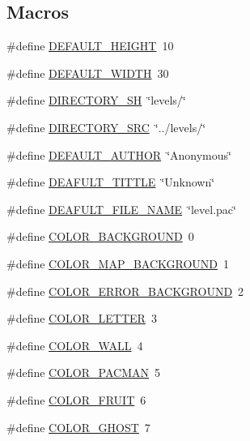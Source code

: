 \subsection*{Macros}
\begin{DoxyCompactItemize}
\item 
\#define \hyperlink{pacman-level-editor_8c_a1879f9e5604a01f0983829846001ab23}{D\-E\-F\-A\-U\-L\-T\-\_\-\-H\-E\-I\-G\-H\-T}~10
\item 
\#define \hyperlink{pacman-level-editor_8c_a93493eb8fae5549bd5be67f3449245e0}{D\-E\-F\-A\-U\-L\-T\-\_\-\-W\-I\-D\-T\-H}~30
\item 
\#define \hyperlink{pacman-level-editor_8c_a7a602a4376595097bdde82a739d7fc9c}{D\-I\-R\-E\-C\-T\-O\-R\-Y\-\_\-\-S\-H}~\char`\"{}levels/\char`\"{}
\item 
\#define \hyperlink{pacman-level-editor_8c_a680ab63d028a68a793615c14b807244e}{D\-I\-R\-E\-C\-T\-O\-R\-Y\-\_\-\-S\-R\-C}~\char`\"{}../levels/\char`\"{}
\item 
\#define \hyperlink{pacman-level-editor_8c_a0df6a4797ddf20bd10851daf8ba3e223}{D\-E\-F\-A\-U\-L\-T\-\_\-\-A\-U\-T\-H\-O\-R}~\char`\"{}Anonymous\char`\"{}
\item 
\#define \hyperlink{pacman-level-editor_8c_a4b3befe82323eb5de5dc65ccf44283ea}{D\-E\-A\-F\-U\-L\-T\-\_\-\-T\-I\-T\-T\-L\-E}~\char`\"{}Unknown\char`\"{}
\item 
\#define \hyperlink{pacman-level-editor_8c_afd9e8106b9402bf121477c457c8c9316}{D\-E\-A\-F\-U\-L\-T\-\_\-\-F\-I\-L\-E\-\_\-\-N\-A\-M\-E}~\char`\"{}level.\-pac\char`\"{}
\item 
\#define \hyperlink{pacman-level-editor_8c_af27cfac70191e90ee59f2fbfc0142df5}{C\-O\-L\-O\-R\-\_\-\-B\-A\-C\-K\-G\-R\-O\-U\-N\-D}~0
\item 
\#define \hyperlink{pacman-level-editor_8c_aa0c3931283632f3b28ad3ab6fe6d7ffb}{C\-O\-L\-O\-R\-\_\-\-M\-A\-P\-\_\-\-B\-A\-C\-K\-G\-R\-O\-U\-N\-D}~1
\item 
\#define \hyperlink{pacman-level-editor_8c_a74d87509e98e202c778b5a9e4ae89f09}{C\-O\-L\-O\-R\-\_\-\-E\-R\-R\-O\-R\-\_\-\-B\-A\-C\-K\-G\-R\-O\-U\-N\-D}~2
\item 
\#define \hyperlink{pacman-level-editor_8c_ab604bbfe7359083e9abc00907e8acb12}{C\-O\-L\-O\-R\-\_\-\-L\-E\-T\-T\-E\-R}~3
\item 
\#define \hyperlink{pacman-level-editor_8c_a528521b4019fe0dbc561165851660df5}{C\-O\-L\-O\-R\-\_\-\-W\-A\-L\-L}~4
\item 
\#define \hyperlink{pacman-level-editor_8c_a977b7c2763deb11541bc962426297045}{C\-O\-L\-O\-R\-\_\-\-P\-A\-C\-M\-A\-N}~5
\item 
\#define \hyperlink{pacman-level-editor_8c_aa621edd711419dc69326010aabdb01bb}{C\-O\-L\-O\-R\-\_\-\-F\-R\-U\-I\-T}~6
\item 
\#define \hyperlink{pacman-level-editor_8c_a4dff2b6100530a45e7c3b38c9484f454}{C\-O\-L\-O\-R\-\_\-\-G\-H\-O\-S\-T}~7
\end{DoxyCompactItemize}
